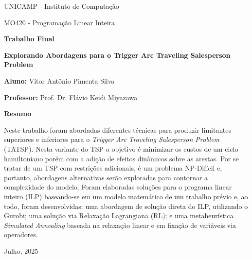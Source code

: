 \documentclass[12pt]{report}
\begin{document}
\begin{titlepage}
    \centering

    {\Large UNICAMP - Instituto de Computação \par}
    {\Large MO420 - Programação Linear Inteira \par}

    \vspace{0.5cm}

    {\Large \textbf{Trabalho Final} \par}
    {\Large \textbf{Explorando Abordagens para o Trigger Arc Traveling Salesperson Problem} \par}
    \vspace{1cm}

    {\Large \textbf{Aluno:} Vitor Antônio Pimenta Silva \par}
    \vspace{0.5cm}

    {\Large \textbf{Professor:} Prof. Dr. Flávio Keidi Miyazawa \par}
    \vspace{0.7cm}

    {\Large \textbf{Resumo} \par}  
    \vspace{0.5cm}

    \begin{flushleft}
        \justifying
        Neste trabalho foram abordadas diferentes técnicas para produzir limitantes superiores e inferiores para o \emph{Trigger Arc Traveling Salesperson Problem} (TATSP). Nesta variante do TSP o objetivo é minimizar os custos de um ciclo hamiltoniano porém com a adição de efeitos dinâmicos sobre as arestas. Por se tratar de um TSP com restrições adicionais, é um problema NP-Difícil e, portanto, abordagens alternativas serão exploradas para contornar a complexidade do modelo. Foram elaboradas soluções para o programa linear inteiro (ILP) baseando-se em um modelo matemático de um trabalho prévio e, ao todo, foram desenvolvidas: uma abordagem de solução direta do ILP, utilizando o Gurobi; uma solução via Relaxação Lagrangiana (RL); e uma metaheurística \emph{Simulated Annealing} baseada na relaxação linear e em fixação de variáveis via operadores.
    \end{flushleft}
 
    \vfill
    {\Large Julho, 2025 \par}
\end{titlepage}

\end{document}
